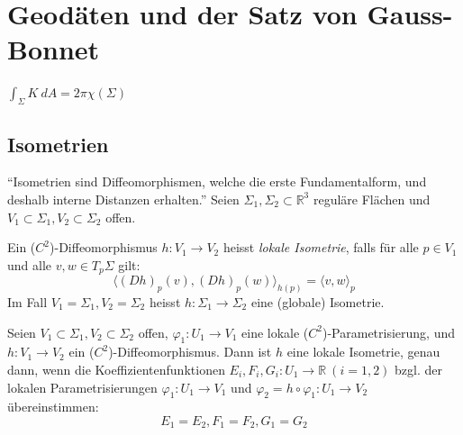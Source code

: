 \documentclass[../main.tex]{subfiles}
\begin{document}
\chapter{Geodäten und der Satz von Gauss-Bonnet}

\begin{goal}
    $\int _{\Sigma} K \ dA = 2\pi \chi (\Sigma)$
\end{goal}

\section{Isometrien}
``Isometrien sind Diffeomorphismen, welche die erste Fundamentalform, und deshalb interne
Distanzen erhalten.''
Seien $\Sigma _1, \Sigma _2 \subset \mathbb{R}^3$ reguläre Flächen und $V_1 \subset \Sigma_1, V_2 \subset \Sigma_2$ offen.

\begin{definition}
    Ein ($C^2$)-Diffeomorphismus $h: V_1 \to V_2$ heisst \emph{lokale Isometrie}, falls
    für alle $p \in V_1$ und alle $v,w \in T_p\Sigma$ gilt:
    $$\langle (Dh)_p(v), (Dh)_p(w)\rangle _{h(p)}=\langle v,w \rangle _p$$
    Im Fall $V_1 = \Sigma _1, V_2 = \Sigma _2$ heisst $h: \Sigma _1 \to \Sigma _2$ eine (globale) Isometrie.
\end{definition}

\begin{proposition}
    Seien $V_1 \subset \Sigma _1, V_2 \subset \Sigma _2$ offen, $\varphi_1:U_1 \to V_1$
    eine lokale ($C^2$)-Parametrisierung, und $h: V_1 \to V_2$ ein ($C^2$)-Diffeomorphismus.
    Dann ist $h$ eine lokale Isometrie, genau dann, wenn die Koeffizientenfunktionen
    $E_i,F_i,G_i: U_1 \to \mathbb{R} \ (i=1,2)$ bzgl. der lokalen Parametrisierungen
    $\varphi_1: U_1 \to V_1$ und $\varphi_2 = h \circ \varphi_1 : U_1 \to V_2$ übereinstimmen:
    $$E_1=E_2, F_1=F_2, G_1=G_2$$
    \begin{figure}[H]
        \centering
        \def\svgwidth{20em}
        
    \end{figure}
\end{proposition}
\end{document}
